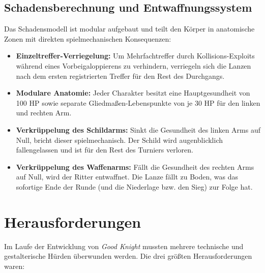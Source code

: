\documentclass[11pt, a4paper]{article}
\begin{document}
\subsection{Schadensberechnung und Entwaffnungssystem}
Das Schadensmodell ist modular aufgebaut und teilt den Körper in anatomische Zonen mit direkten spielmechanischen Konsequenzen:
\begin{itemize}
    \item \textbf{Einzeltreffer-Verriegelung:} Um Mehrfachtreffer durch Kollisions-Exploits während eines Vorbeigaloppierens zu verhindern, verriegeln sich die Lanzen nach dem ersten registrierten Treffer für den Rest des Durchgangs.
    \item \textbf{Modulare Anatomie:} Jeder Charakter besitzt eine Hauptgesundheit von 100 HP sowie separate Gliedmaßen-Lebenspunkte von je 30 HP für den linken und rechten Arm.
    \item \textbf{Verkrüppelung des Schildarms:} Sinkt die Gesundheit des linken Arms auf Null, bricht dieser spielmechanisch. Der Schild wird augenblicklich fallengelassen und ist für den Rest des Turniers verloren.
    \item \textbf{Verkrüppelung des Waffenarms:} Fällt die Gesundheit des rechten Arms auf Null, wird der Ritter entwaffnet. Die Lanze fällt zu Boden, was das sofortige Ende der Runde (und die Niederlage bzw. den Sieg) zur Folge hat.
\end{itemize}

\newpage
\section{Herausforderungen}
Im Laufe der Entwicklung von \textit{Good Knight} mussten mehrere technische und gestalterische Hürden überwunden werden. Die drei größten Herausforderungen waren:
\end{document}
